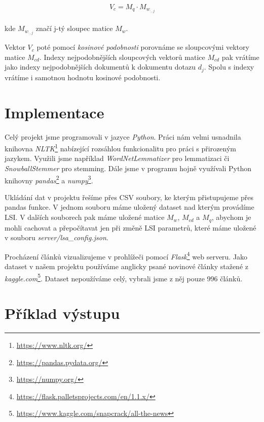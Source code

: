 \documentclass[11pt]{scrartcl} %
\begin{document}
\begin{align}
	\begin{split}
		V_c = M_q \cdot M_{w_{:,j}}
	\end{split}					
\end{align}

kde $M_{w_{:,j}}$ značí j-tý sloupec matice $M_w$.

\bigskip

Vektor $V_c$ poté pomocí \emph{kosinové podobnosti} porovnáme se sloupcovými vektory matice $M_{cd}$. Indexy nejpodobnějších sloupcových vektorů matice $M_{cd}$ pak vrátíme jako indexy nejpodobnějších dokumentů k dokumentu dotazu $d_j$. Spolu s indexy vrátíme i samotnou hodnotu kosinové podobnosti.

\section{Implementace}

Celý projekt jsme programovali v jazyce \emph{Python}. Práci nám velmi usnadnila knihovna \emph{NLTK}\footnote{\url{https://www.nltk.org/}} nabízející rozsáhlou funkcionalitu pro práci s přirozeným jazykem. Využili jsme například \emph{WordNetLemmatizer} pro lemmatizaci či \emph{SnowballStemmer} pro stemming. Dále jsme v programu hojně využívali Python knihovny \emph{pandas}\footnote{\url{https://pandas.pydata.org/}} a \emph{numpy}\footnote{\url{https://numpy.org/}}.

\bigskip

Ukládání dat v projektu řešíme přes CSV soubory, ke kterým přistupujeme přes pandas funkce. V jednom souboru máme uložený dataset nad kterým provádíme LSI. V dalších souborech pak máme uložené matice $M_w$, $M_{cd}$ a $M_q$, abychom je mohli cachovat a přepočítavat jen při změně LSI parametrů, které máme uložené v souboru \emph{server/lsa\_config.json}.

\bigskip

Procházení článků vizualizujeme v prohlížeči pomocí \emph{Flask}\footnote{\url{https://flask.palletsprojects.com/en/1.1.x/}} web serveru. Jako dataset v našem projektu používáme anglicky psané novinové články stažené z \emph{kaggle.com}\footnote{\url{https://www.kaggle.com/snapcrack/all-the-news}}. Dataset nepoužíváme celý, vybrali jsme z něj pouze 996 článků.

\section{Příklad výstupu}
\end{document}
